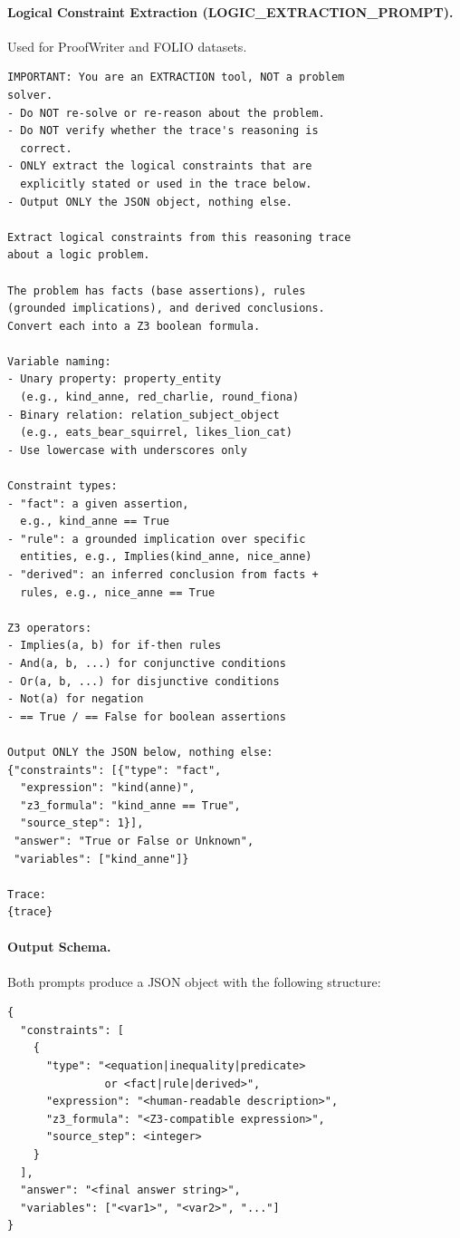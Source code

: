 \paragraph{Logical Constraint Extraction (LOGIC\_EXTRACTION\_PROMPT).}

Used for ProofWriter and FOLIO datasets.

\begin{lstlisting}
IMPORTANT: You are an EXTRACTION tool, NOT a problem
solver.
- Do NOT re-solve or re-reason about the problem.
- Do NOT verify whether the trace's reasoning is
  correct.
- ONLY extract the logical constraints that are
  explicitly stated or used in the trace below.
- Output ONLY the JSON object, nothing else.

Extract logical constraints from this reasoning trace
about a logic problem.

The problem has facts (base assertions), rules
(grounded implications), and derived conclusions.
Convert each into a Z3 boolean formula.

Variable naming:
- Unary property: property_entity
  (e.g., kind_anne, red_charlie, round_fiona)
- Binary relation: relation_subject_object
  (e.g., eats_bear_squirrel, likes_lion_cat)
- Use lowercase with underscores only

Constraint types:
- "fact": a given assertion,
  e.g., kind_anne == True
- "rule": a grounded implication over specific
  entities, e.g., Implies(kind_anne, nice_anne)
- "derived": an inferred conclusion from facts +
  rules, e.g., nice_anne == True

Z3 operators:
- Implies(a, b) for if-then rules
- And(a, b, ...) for conjunctive conditions
- Or(a, b, ...) for disjunctive conditions
- Not(a) for negation
- == True / == False for boolean assertions

Output ONLY the JSON below, nothing else:
{"constraints": [{"type": "fact",
  "expression": "kind(anne)",
  "z3_formula": "kind_anne == True",
  "source_step": 1}],
 "answer": "True or False or Unknown",
 "variables": ["kind_anne"]}

Trace:
{trace}
\end{lstlisting}

\paragraph{Output Schema.}

Both prompts produce a JSON object with the following structure:

\begin{lstlisting}
{
  "constraints": [
    {
      "type": "<equation|inequality|predicate>
               or <fact|rule|derived>",
      "expression": "<human-readable description>",
      "z3_formula": "<Z3-compatible expression>",
      "source_step": <integer>
    }
  ],
  "answer": "<final answer string>",
  "variables": ["<var1>", "<var2>", "..."]
}
\end{lstlisting}

